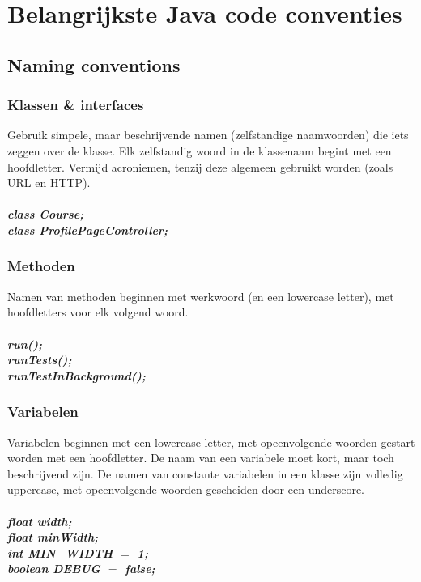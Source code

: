 \section{Belangrijkste Java code conventies}
\subsection{Naming conventions}
	\subsubsection{Klassen \& interfaces}
		Gebruik simpele, maar beschrijvende namen (zelfstandige naamwoorden) die iets zeggen over de klasse. Elk zelfstandig woord in de klassenaam begint met een hoofdletter. Vermijd acroniemen, tenzij deze algemeen gebruikt worden (zoals URL en HTTP).
		\\ \\
		\emph{\textbf{class Course;}} \\
		\emph{\textbf{class ProfilePageController;}}
		
	\subsubsection{Methoden}
		Namen van methoden beginnen met werkwoord (en een lowercase letter), met hoofdletters voor elk volgend woord.
		\\ \\
		\emph{\textbf{run();}} \\
		\emph{\textbf{runTests();}} \\
		\emph{\textbf{runTestInBackground();}}
		
	\subsubsection{Variabelen}
		Variabelen beginnen met een lowercase letter, met opeenvolgende woorden gestart worden met een hoofdletter. 
		De naam van een variabele moet kort, maar toch beschrijvend zijn. 
		De namen van constante variabelen in een klasse zijn volledig uppercase, met opeenvolgende woorden gescheiden door een underscore.
		\\ \\		
		\emph{\textbf{float width;}} \\
		\emph{\textbf{float minWidth;}} \\
		\emph{\textbf{int MIN\_WIDTH $=$ 1;}} \\
		\emph{\textbf{boolean DEBUG $=$ false;}} \\
		
